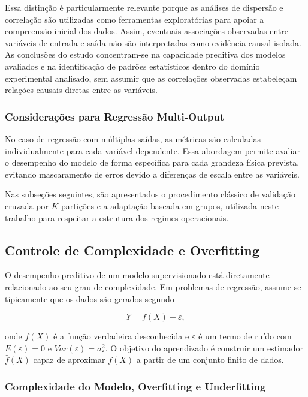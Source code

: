 Essa distinção é particularmente relevante porque as análises de dispersão e correlação são utilizadas como ferramentas exploratórias para apoiar a compreensão inicial dos dados. Assim, eventuais associações observadas entre variáveis de entrada e saída não são interpretadas como evidência causal isolada. As conclusões do estudo concentram-se na capacidade preditiva dos modelos avaliados e na identificação de padrões estatísticos dentro do domínio experimental analisado, sem assumir que as correlações observadas estabeleçam relações causais diretas entre as variáveis.

\subsubsection*{Considerações para Regressão Multi-Output}

No caso de regressão com múltiplas saídas, as métricas são calculadas individualmente para cada variável dependente. Essa abordagem permite avaliar o desempenho do modelo de forma específica para cada grandeza física prevista, evitando mascaramento de erros devido a diferenças de escala entre as variáveis.

Nas subseções seguintes, são apresentados o procedimento clássico de validação cruzada por \(K\) partições e a adaptação baseada em grupos, utilizada neste trabalho para respeitar a estrutura dos regimes operacionais.

\subsection{Controle de Complexidade e Overfitting}

O desempenho preditivo de um modelo supervisionado está diretamente relacionado ao seu grau de complexidade. Em problemas de regressão, assume-se tipicamente que os dados são gerados segundo

\begin{equation}
Y = f(X) + \varepsilon,
\end{equation}

onde $f(X)$ é a função verdadeira desconhecida e $\varepsilon$ é um termo de ruído com $E(\varepsilon)=0$ e $Var(\varepsilon)=\sigma_\varepsilon^2$. O objetivo do aprendizado é construir um estimador $\hat{f}(X)$ capaz de aproximar $f(X)$ a partir de um conjunto finito de dados. \cite{Hastie2009ESL}


\subsubsection{Complexidade do Modelo, Overfitting e Underfitting}

